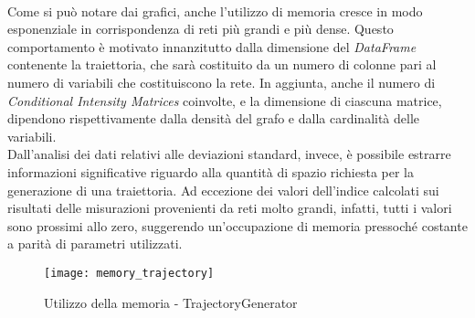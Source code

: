   \paragraph{}
  Come si può notare dai grafici, anche l'utilizzo di memoria cresce in modo esponenziale in
  corrispondenza di reti più grandi e più dense. Questo comportamento è motivato innanzitutto dalla dimensione del 
  \textit{DataFrame} contenente la traiettoria, che sarà costituito da un numero di colonne pari al numero
  di variabili che costituiscono la rete. In aggiunta, anche il numero di \textit{Conditional Intensity Matrices} coinvolte, 
  e la dimensione di ciascuna matrice, dipendono rispettivamente dalla densità del grafo e dalla 
  cardinalità delle variabili.\\
  Dall'analisi dei dati relativi alle deviazioni standard, invece, è possibile estrarre informazioni
  significative riguardo alla quantità di spazio richiesta per la generazione di una traiettoria.
  Ad eccezione dei valori dell'indice calcolati sui risultati delle misurazioni provenienti da reti molto grandi, infatti, 
  tutti i valori sono prossimi allo zero, suggerendo un'occupazione di memoria pressoché costante a
  parità di parametri utilizzati.

  \begin{figure}[H]
    \texttt{[image: memory\_trajectory]}
    \centering
    \caption{Utilizzo della memoria - TrajectoryGenerator}
  \end{figure}

  \vspace{10mm}

